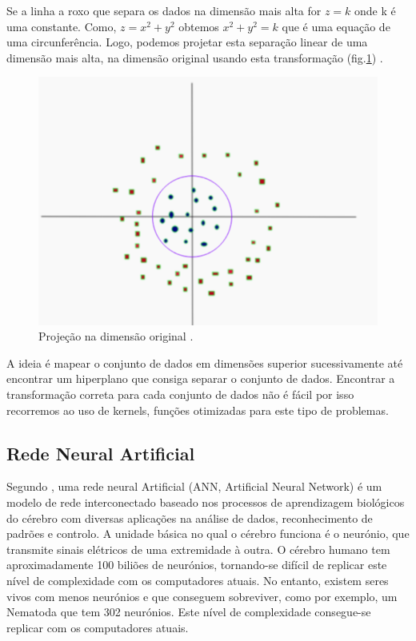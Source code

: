 Se a linha a roxo que separa os dados na dimensão mais alta for $z = k$ onde k é uma constante. Como, $z = x^2+y^2$  obtemos  $x^2+y^2 = k$ que é uma equação de uma circunferência. Logo, podemos projetar esta separação linear de uma dimensão mais alta, na dimensão original usando esta transformação (fig.\ref{svm5}) \cite{svm_dois}.

\begin{figure}[H]
\centering
\includegraphics[scale=0.3]{figs/svm5}
\caption{Projeção na dimensão original \cite{svm_dois}.}\label{svm5}
\end{figure}

A ideia é mapear o conjunto de dados em dimensões superior sucessivamente até encontrar um hiperplano que consiga separar o conjunto de dados. Encontrar a transformação correta para cada conjunto de dados não é fácil por isso recorremos ao uso de kernels, funções otimizadas para este tipo de problemas. 





\subsection{Rede Neural Artificial}

Segundo \textcite{ANN.Basic.Concepts}, uma rede neural Artificial (ANN, Artificial Neural Network) é um modelo de rede interconectado baseado nos processos de aprendizagem biológicos do cérebro com diversas aplicações na análise de dados, reconhecimento de padrões e controlo. 
A unidade básica no qual o cérebro funciona é o neurónio, que transmite sinais elétricos de uma extremidade à outra. O cérebro humano tem aproximadamente 100 biliões de neurónios, tornando-se difícil de replicar este nível de complexidade com os computadores atuais. No entanto, existem seres vivos com menos neurónios e que conseguem sobreviver, como por exemplo, um Nematoda que tem 302 neurónios. Este nível de complexidade consegue-se replicar com os computadores atuais.

